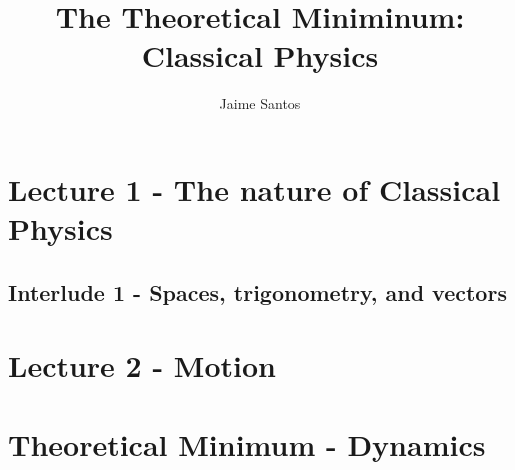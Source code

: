 \documentclass{book}
\title{The Theoretical Miniminum: Classical Physics}
\author{Jaime Santos}
\begin{document}
\maketitle
\tableofcontents

\chapter{Lecture 1 - The nature of Classical Physics}
    
    \section{Interlude 1 - Spaces, trigonometry, and vectors}
        

\chapter{Lecture 2 - Motion}
    

\chapter{Theoretical Minimum - Dynamics}
    





\end{document}
